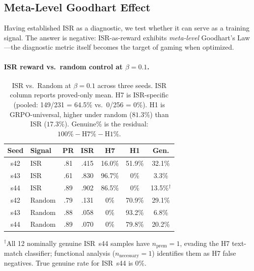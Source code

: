 \subsection{Meta-Level Goodhart Effect}
\label{sec:goodhart}

Having established ISR as a diagnostic, we test whether it can serve as a training signal.
The answer is negative: ISR-as-reward exhibits \emph{meta-level} Goodhart's Law \cite{manheim2019categorizing}---the diagnostic metric itself becomes the target of gaming when optimized.

\paragraph{ISR reward vs.\ random control at $\beta{=}0.1$.}

\begin{table}[t]
\centering
\small
\setlength{\tabcolsep}{3.5pt}
\caption{ISR vs.\ Random at $\beta{=}0.1$ across three seeds. ISR column reports proved-only mean. H7 is ISR-specific (pooled: 149/231 = 64.5\% vs.\ 0/256 = 0\%). H1 is GRPO-universal, higher under random ($81.3\%$) than ISR ($17.3\%$). Genuine\% is the residual: $100\% - \text{H7}\% - \text{H1}\%$.}
\label{tab:beta01}
\begin{tabular}{clccccc}
\toprule
\textbf{Seed} & \textbf{Signal} & \textbf{PR} & \textbf{ISR} & \textbf{H7} & \textbf{H1} & \textbf{Gen.} \\
\midrule
s42 & ISR    & .81 & .415 & 16.0\% & 51.9\% & 32.1\% \\
s43 & ISR    & .61 & .830 & 96.7\% &  0\% &  3.3\% \\
s44 & ISR    & .89 & .902 & 86.5\% &  0\% & 13.5\%$^\dagger$ \\
\midrule
s42 & Random & .79 & .131 &  0\% & 70.9\% & 29.1\% \\
s43 & Random & .88 & .058 &  0\% & 93.2\% &  6.8\% \\
s44 & Random & .89 & .070 &  0\% & 79.8\% & 20.2\% \\
\bottomrule
\end{tabular}

\vspace{2pt}
\begin{minipage}{\columnwidth}
\footnotesize
$^\dagger$All 12 nominally genuine ISR~s44 samples have $n_{\text{prem}}{=}1$, evading the H7 text-match classifier; functional analysis ($n_{\text{necessary}}{=}1$) identifies them as H7 false negatives.
True genuine rate for ISR~s44 is 0\%.
\end{minipage}
\end{table}

